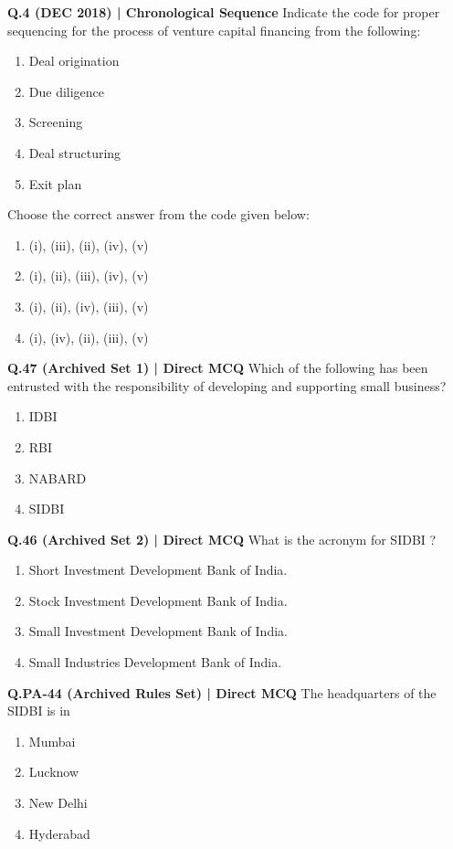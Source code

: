 \documentclass{article}
\begin{document}
\textbf{Q.4 (DEC 2018) | Chronological Sequence}
Indicate the code for proper sequencing for the process of venture capital financing from the following:
\begin{enumerate}[label=\arabic*.]
    \item Deal origination
    \item Due diligence
    \item Screening
    \item Deal structuring
    \item Exit plan
\end{enumerate}
Choose the correct answer from the code given below:
\begin{enumerate}[label=(\arabic*)]
    \item (i), (iii), (ii), (iv), (v)
    \item (i), (ii), (iii), (iv), (v)
    \item (i), (ii), (iv), (iii), (v)
    \item (i), (iv), (ii), (iii), (v)
\end{enumerate}

\textbf{Q.47 (Archived Set 1) | Direct MCQ}
Which of the following has been entrusted with the responsibility of developing and supporting small business?
\begin{enumerate}[label=(\arabic*)]
    \item IDBI
    \item RBI
    \item NABARD
    \item SIDBI
\end{enumerate}

\textbf{Q.46 (Archived Set 2) | Direct MCQ}
What is the acronym for SIDBI ?
\begin{enumerate}[label=(\arabic*)]
    \item Short Investment Development Bank of India.
    \item Stock Investment Development Bank of India.
    \item Small Investment Development Bank of India.
    \item Small Industries Development Bank of India.
\end{enumerate}

\textbf{Q.PA-44 (Archived Rules Set) | Direct MCQ}
The headquarters of the SIDBI is in
\begin{enumerate}[label=(\arabic*)]
    \item Mumbai
    \item Lucknow
    \item New Delhi
    \item Hyderabad
\end{enumerate}
\end{document}
